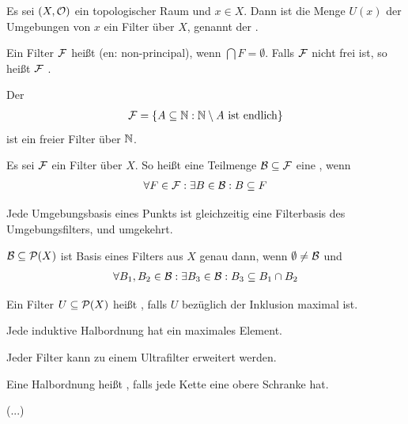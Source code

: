\documentclass{report}
\begin{document}
\begin{theorem}
	Es sei $(X, \mathcal{O})$ ein topologischer Raum und $x \in X$. Dann ist die Menge $U(x)$ der Umgebungen von $x$ ein Filter über $X$, genannt der .
\end{theorem}
\begin{definition}
	Ein Filter $\mathcal{F}$ heißt  (en: non-principal), wenn $\bigcap F = \emptyset$. Falls $\mathcal{F}$ nicht frei ist, so heißt $\mathcal{F}$ .
\end{definition}
\begin{theorem}
	Der  
	\begin{align*}
		\mathcal{F} = \qty{A \subseteq \mathbb{N}: \mathbb{N}\setminus A \textnormal{ ist endlich}}
	\end{align*}
	ist ein freier Filter über $\mathbb{N}$.
\end{theorem}
\begin{definition}
	Es sei $\mathcal{F}$ ein Filter über $X$. So heißt eine Teilmenge $\mathcal{B} \subseteq \mathcal{F}$ eine , wenn
	\begin{align*}
		\forall F \in \mathcal{F} : \exists B \in \mathcal{B} : B \subseteq F
	\end{align*}
\end{definition}
\begin{example}
	Jede Umgebungsbasis eines Punkts ist gleichzeitig eine Filterbasis des Umgebungsfilters, und umgekehrt.
\end{example}
\begin{theorem}
	$\mathcal{B} \subseteq \mathcal{P}(X)$ ist Basis eines Filters aus $X$ genau dann, wenn $\emptyset \neq \mathcal{B}$ und
	\begin{align*}
		\forall B_1, B_2 \in \mathcal{B}: \exists B_3 \in \mathcal{B} : B_3 \subseteq B_1 \cap B_2
	\end{align*}
\end{theorem}
\begin{definition}
	Ein Filter $U \subseteq \mathcal{P}(X)$ heißt , falls $U$ bezüglich der Inklusion maximal ist.
\end{definition}
\begin{theorem}
	 Jede induktive Halbordnung hat ein maximales Element.
\end{theorem}
\begin{corollary}
	Jeder Filter kann zu einem Ultrafilter erweitert werden.
\end{corollary}
\begin{definition}
	Eine Halbordnung heißt , falls jede Kette eine obere Schranke hat.
\end{definition}
(...)
\end{document}
